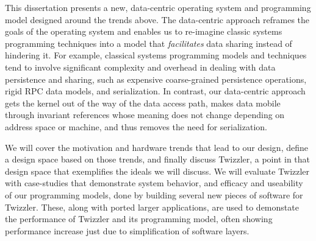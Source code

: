 
This dissertation presents a new, data-centric operating system and programming model designed around the trends above.
The data-centric approach reframes the goals of the operating system and enables us to re-imagine classic systems
programming techniques into a model that \emph{facilitates} data sharing instead of hindering it. For example, classical
systems programming models and techniques tend to involve significant complexity and overhead in dealing with data persistence and
sharing, such as expensive coarse-grained persistence operations, rigid RPC data models, and serialization. In contrast,
our data-centric approach gets the kernel out of the way of the data access path, makes data mobile through invariant
references whose meaning does not change depending on address space or machine, and thus removes the need for serialization.

We will cover the motivation and hardware trends
that lead to our design, define a design space based on those trends, and finally discuss Twizzler, a point in that
design space that exemplifies the ideals we will discuss. We will evaluate Twizzler with case-studies that demonstrate
system behavior, and efficacy and useability of our programming models, done by building several new pieces of software
for Twizzler. These, along with ported larger applications, are used to demonstate the performance of Twizzler and its
programming model, often showing performance increase just due to simplification of software layers.

\vfill


\endgroup

\vfill
